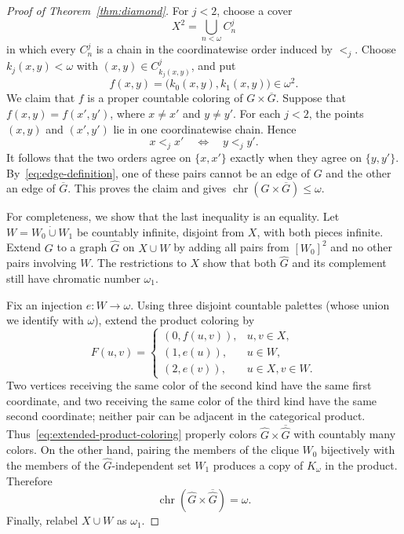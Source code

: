 \documentclass[10pt,a4paper]{amsart}
\numberwithin{equation}{section}
\theoremstyle{definition}
\theoremstyle{remark}
\newcommand{\chr}{\operatorname{chr}}
\begin{document}
\begin{proof}[Proof of Theorem~\ref{thm:diamond}]
For $j<2$, choose a cover
\begin{displaymath}
 X^2=\bigcup_{n<\omega}C_n^j
\end{displaymath}
in which every $C_n^j$ is a chain in the coordinatewise order induced
by $<_{j}$.  Choose $k_j(x,y)<\omega$ with
$(x,y)\in C_{k_j(x,y)}^j$, and put
\begin{displaymath}
 f(x,y)=\bigl(k_0(x,y),k_1(x,y)\bigr)\in\omega^2.
\end{displaymath}
We claim that $f$ is a proper countable coloring of
$G\times\overline G$.  Suppose that
$f(x,y)=f(x',y')$, where $x\ne x'$ and $y\ne y'$.  For each
$j<2$, the points $(x,y)$ and $(x',y')$ lie in one coordinatewise
chain.  Hence
\begin{displaymath}
 x<_{j}x'\quad\Longleftrightarrow\quad y<_{j}y'.
\end{displaymath}
It follows that the two orders agree on $\{x,x'\}$ exactly when they agree on
$\{y,y'\}$.  By~\eqref{eq:edge-definition}, one of these pairs cannot
be an edge of $G$ and the other an edge of $\overline G$.  This proves
the claim and gives
$\chr(G\times\overline G)\leq\omega$.

For completeness, we show that the last inequality is an equality.
Let $W=W_0\mathbin{\dot\cup}W_1$ be countably infinite, disjoint from
$X$, with both pieces infinite.  Extend $G$ to a graph $\widehat G$ on
$X\cup W$ by adding all pairs from $[W_0]^2$ and no other pairs
involving $W$.  The restrictions to $X$ show that both $\widehat G$
and its complement still have chromatic number $\omega_1$.

Fix an injection $e:W\to\omega$.  Using three disjoint countable
palettes (whose union we identify with $\omega$), extend the product
coloring by
\begin{equation}\label{eq:extended-product-coloring}
 F(u,v)=
 \begin{cases}
  (0,f(u,v)),&u,v\in X,\\
  (1,e(u)),&u\in W,\\
  (2,e(v)),&u\in X, v\in W.
 \end{cases}
\end{equation}
Two vertices receiving the same color of the second kind have the
same first coordinate, and two receiving the same color of the third
kind have the same second coordinate; neither pair can be adjacent in
the categorical product.  Thus~\eqref{eq:extended-product-coloring}
properly colors
$\widehat G\times\overline{\widehat G}$ with countably many colors.
On the other hand, pairing the members of the clique $W_0$ bijectively
with the members of the $\widehat G$-independent set $W_1$ produces a
copy of $K_\omega$ in the product.  Therefore
\begin{displaymath}
 \chr(\widehat G\times\overline{\widehat G})=\omega.
\end{displaymath}
Finally, relabel $X\cup W$ as $\omega_1$.
\end{proof}
\end{document}
